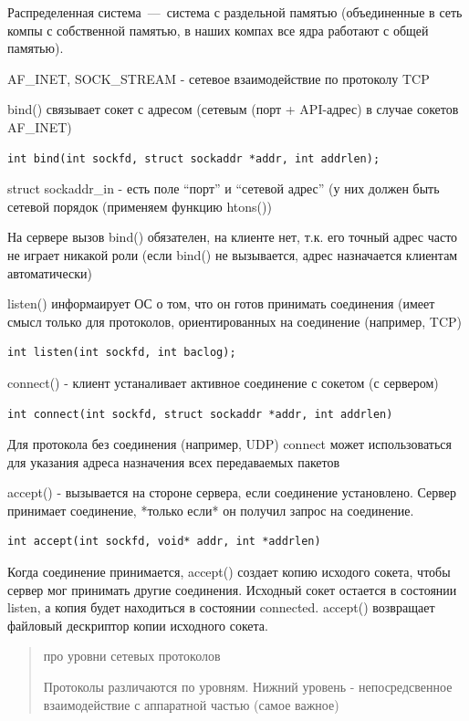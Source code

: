 Распределенная система~---~система с раздельной памятью (объединенные в сеть компы с собственной памятью, в наших компах все ядра работают с общей памятью).

AF\_INET, SOCK\_STREAM - сетевое взаимодействие по протоколу TCP

bind() связывает сокет с адресом (сетевым (порт + API-адрес) в случае сокетов AF\_INET)

\begin{lstlisting}
int bind(int sockfd, struct sockaddr *addr, int addrlen);
\end{lstlisting}

struct sockaddr\_in - есть поле “порт” и “сетевой адрес” (у них должен быть сетевой порядок (применяем функцию htons())

На сервере вызов bind() обязателен, на клиенте нет, т.к. его точный адрес часто не играет никакой роли (если bind() не вызывается, адрес назначается клиентам автоматически)

listen() информаирует ОС о том, что он готов принимать соединения (имеет смысл только для протоколов, ориентированных на соединение (например, TCP)

\begin{lstlisting}
int listen(int sockfd, int baclog);
\end{lstlisting}
connect() - клиент устаналивает активное соединение с сокетом (с сервером)
\begin{lstlisting}
int connect(int sockfd, struct sockaddr *addr, int addrlen)
\end{lstlisting}

Для протокола без соединения (например, UDP) connect может использоваться для указания адреса назначения всех передаваемых пакетов

accept() - вызывается на стороне сервера, если соединение установлено. Сервер принимает соединение, *только если* он получил запрос на соединение.

\begin{lstlisting}
int accept(int sockfd, void* addr, int *addrlen)
\end{lstlisting}

Когда соединение принимается, accept()  создает копию исходого сокета, чтобы сервер мог принимать другие соединения. Исходный сокет остается в состоянии listen, а копия будет находиться в состоянии connected. accept() возвращает файловый дескриптор копии исходного сокета.

\begin{quote}
про уровни сетевых протоколов

Протоколы различаются по уровням. Нижний уровень - непосредсвенное взаимодействие с аппаратной частью (самое важное)
\end{quote}

